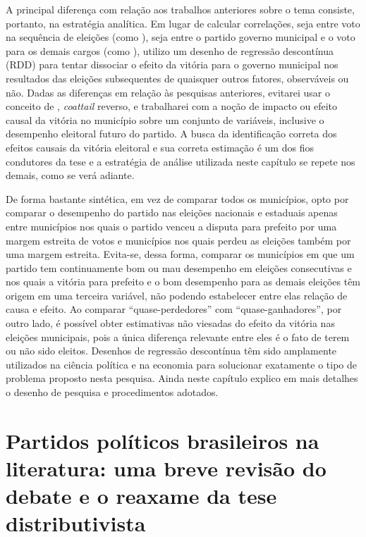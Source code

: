 A principal diferença com relação aos trabalhos anteriores sobre o tema consiste, portanto, na estratégia analítica. Em lugar de calcular correlações, seja entre voto na sequência de eleições (como \citealp{Carneiro2008}), seja entre o partido governo municipal e o voto para os demais cargos (como \citealp{Ames1994}), utilizo um desenho de regressão descontínua (RDD) para tentar dissociar o efeito da vitória para o governo municipal nos resultados das eleições subsequentes de quaisquer outros fatores, observáveis ou não. Dadas as diferenças em relação às pesquisas anteriores, evitarei usar o conceito de \citet{Ames1994}, \emph{coattail} reverso, e trabalharei com a noção de impacto ou efeito causal da vitória no município sobre um conjunto de variáveis, inclusive o desempenho eleitoral futuro do partido. A busca da identificação correta dos efeitos causais da vitória eleitoral e sua correta estimação é um dos fios condutores da tese e a estratégia de análise utilizada neste capítulo se repete nos demais, como se verá adiante.

De forma bastante sintética, em vez de comparar todos os municípios, opto por comparar o desempenho do partido nas eleições nacionais e estaduais apenas entre municípios nos quais o partido venceu a disputa para prefeito por uma margem estreita de votos e municípios nos quais perdeu as eleições também por uma margem estreita. Evita-se, dessa forma, comparar os municípios em que um partido tem continuamente bom ou mau desempenho em eleições consecutivas e nos quais a vitória para prefeito e o bom desempenho para as demais eleições têm origem em uma terceira variável, não podendo estabelecer entre elas relação de causa e efeito. Ao comparar ``quase-perdedores'' com ``quase-ganhadores'', por outro lado, é possível obter estimativas não viesadas do efeito da vitória nas eleições municipais, pois a única diferença relevante entre eles é o fato de terem ou não sido eleitos. Desenhos de regressão descontínua têm sido amplamente utilizados na ciência política e na economia para solucionar exatamente o tipo de problema proposto nesta pesquisa. Ainda neste capítulo explico em mais detalhes o desenho de pesquisa e procedimentos adotados.

\section{Partidos políticos brasileiros na literatura: uma breve revisão do debate e o reaxame da tese distributivista}

